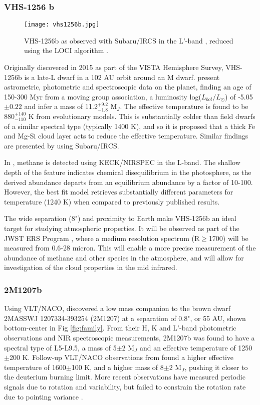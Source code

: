 \subsubsection{VHS-1256 b}
\begin{wrapfigure}{r}{5.5cm}
	\centering
	\texttt{[image: vhs1256b.jpg]}
	\caption{VHS-1256b as observed with Subaru/IRCS in the L'-band \parencite{Rich2016}, reduced using the LOCI algorithm \parencite{Galicher2011}.}
\end{wrapfigure}
Originally discovered in 2015 \parencite{Gauza2015} as part of the VISTA Hemisphere Survey, VHS-1256b is a late-L dwarf in a 102 AU orbit around an M dwarf.
\parencite{Gauza2015} present astrometric, photometric and spectroscopic data on the planet, finding an age of 150-300 Myr from a moving group association, a luminosity log($L_{bol}/L_{\odot}$) of -5.05$\pm0.22$ and infer a mass of 11.2$^{+9.2}_{-1.8}$ M$_{J}$. 
The effective temperature is found to be 880$^{+140}_{-110}$ K from evolutionary models. 
This is substantially colder than field dwarfs of a similar spectral type (typically 1400 K), and so it is proposed that a thick Fe and Mg-Si cloud layer acts to reduce the effective temperature.
Similar findings are presented by \parencite{Rich2016} using Subaru/IRCS.

In \parencite{Miles2018}, methane is detected using KECK/NIRSPEC in the L-band. 
The shallow depth of the feature indicates chemical disequilibrium in the photosphere, as the derived abundance departs from an equilibrium abundance by a factor of 10-100.
However, the best fit model retrieves substantially different parameters for temperature (1240 K) when compared to previously published results.

The wide separation (8") and proximity to Earth make VHS-1256b an ideal target for studying atmospheric properties.
It will be observed as part of the JWST ERS Program \parencite{Hinkley2019}, where a medium resolution spectrum (R$\geq$1700) will be measured from 0.6-28 micron. 
This will enable a more precise measurement of the abundance of methane and other species in the atmosphere, and will allow for investigation of the cloud properties in the mid infrared.
\subsubsection{2M1207b}
Using VLT/NACO, \parencite{Chauvin2004} discovered a low mass companion to the brown dwarf 2MASSWJ 1207334-393254 (2M1207) at a separation of 0.8", or 55 AU, shown bottom-center in Fig \ref{fig:family}. 
From their H, K and L'-band photometric observations and NIR spectroscopic measurements, 2M1207b was found to have a spectral type of L5-L9.5, a mass of 5$\pm2$ M$_{J}$ and an effective temperature of 1250$\pm$200 K. Follow-up VLT/NACO observations from \parencite{Mohanty2007} found a higher effective temperature of 1600$\pm$100 K, and a higher mass of 8$\pm$2 M$_{J}$, pushing it closer to the deuterium burning limit. More recent observations have measured periodic signals due to rotation and variability, but failed to constrain the rotation rate due to pointing variance \parencite{Zhou2019}. 

